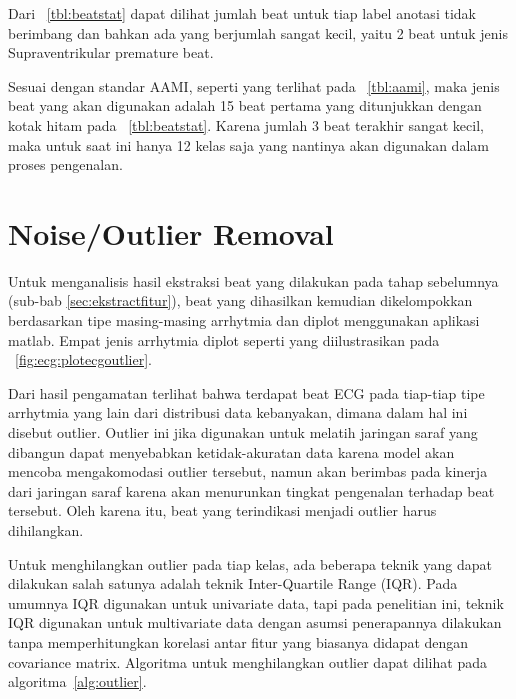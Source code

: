 Dari \tab~\ref{tbl:beatstat} dapat dilihat jumlah beat untuk tiap label anotasi
tidak berimbang dan bahkan ada yang berjumlah sangat kecil, yaitu 2 beat untuk
jenis Supraventrikular premature beat. 

Sesuai dengan standar AAMI, seperti yang terlihat pada \tab~\ref{tbl:aami}, maka
jenis beat yang akan digunakan adalah 15 beat pertama yang ditunjukkan dengan
kotak hitam pada \tab~\ref{tbl:beatstat}. Karena jumlah 3 beat terakhir sangat
kecil, maka untuk saat ini hanya 12 kelas saja yang nantinya akan digunakan
dalam proses pengenalan. \\

\section{Noise/Outlier Removal}
Untuk menganalisis hasil ekstraksi beat yang dilakukan pada tahap sebelumnya
(sub-bab \ref{sec:ekstractfitur}), beat yang dihasilkan kemudian dikelompokkan
berdasarkan tipe masing-masing arrhytmia dan diplot menggunakan aplikasi matlab.
Empat jenis arrhytmia diplot seperti yang diilustrasikan pada
\pic~\ref{fig:ecg:plotecgoutlier}.


Dari hasil pengamatan terlihat bahwa terdapat beat ECG pada tiap-tiap tipe
arrhytmia yang lain dari distribusi data kebanyakan, dimana dalam hal ini
disebut outlier. Outlier ini jika digunakan untuk melatih jaringan saraf
yang dibangun dapat menyebabkan ketidak-akuratan data karena model akan mencoba
mengakomodasi outlier tersebut, namun akan berimbas pada kinerja dari jaringan
saraf karena akan menurunkan tingkat pengenalan terhadap beat tersebut. 
Oleh karena itu, beat yang terindikasi menjadi outlier harus dihilangkan.

Untuk menghilangkan outlier pada tiap kelas, ada beberapa teknik yang dapat
dilakukan salah satunya adalah teknik Inter-Quartile Range (IQR). Pada umumnya
IQR digunakan untuk univariate data, tapi pada penelitian ini, teknik IQR
digunakan untuk multivariate data dengan asumsi penerapannya dilakukan tanpa
memperhitungkan korelasi antar fitur yang biasanya didapat dengan covariance
matrix. Algoritma untuk menghilangkan outlier dapat dilihat pada 
algoritma~\ref{alg:outlier}.
 
